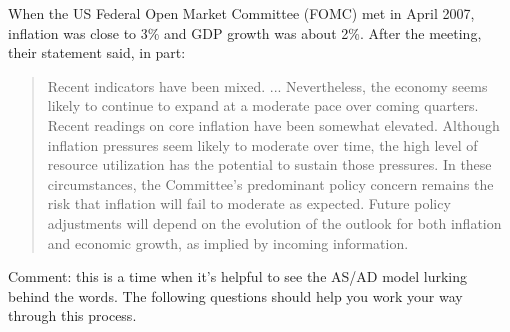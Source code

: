\documentclass[letterpaper,12pt]{exam}
\begin{document}
\begin{questions}
When the US Federal Open Market Committee (FOMC) met in April 2007,
inflation was close to 3\% and GDP growth was about 2\%.
After the meeting,
their statement said, in part:
%
\begin{quote}
Recent indicators have been mixed. ...
Nevertheless, the economy seems likely to continue
to expand at a moderate pace over coming quarters.
%
Recent readings on core inflation have been somewhat elevated.
Although inflation pressures seem likely to moderate over time,
the high level of resource utilization has the potential
to sustain those pressures.
%
In these circumstances, the Committee's predominant policy concern remains the risk that inflation will fail to moderate as expected. Future policy adjustments will depend on the evolution of the outlook for both inflation and economic growth, as implied by incoming information.
\end{quote}
%
Comment:  this is a time when it's helpful to
see the AS/AD model lurking behind the words.
The following questions should help you work your
way through this process.
%


\end{questions}
\end{document}
